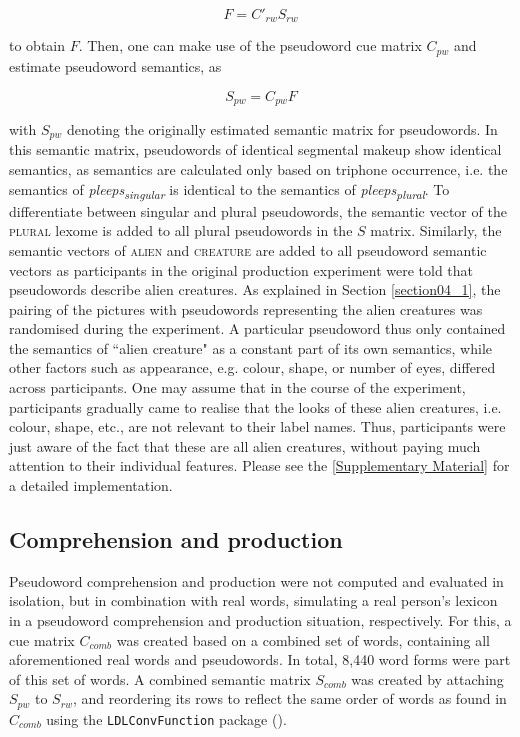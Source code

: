 \begin{equation}
\label{eq:FCSpw}
    F=C'_{rw}S_{rw}
\end{equation}

to obtain $F$. Then, one can make use of the pseudoword cue matrix $C_{pw}$ and estimate pseudoword semantics, as

\begin{equation}
\label{eq:SCFpw}
    S_{pw}=C_{pw}F
\end{equation}

with $S_{pw}$ denoting the originally estimated semantic matrix for pseudowords. In this semantic matrix, pseudowords of identical segmental makeup show identical semantics, as semantics are calculated only based on triphone occurrence, i.e. the semantics of \textit{pleeps\textsubscript{singular}} is identical to the semantics of \textit{pleeps\textsubscript{plural}}. To differentiate between singular and plural pseudowords, the semantic vector of the \textsc{plural} lexome is added to all plural pseudowords in the $S$ matrix. Similarly, the semantic vectors of \textsc{alien} and \textsc{creature} are added to all pseudoword semantic vectors as participants in the original production experiment were told that pseudowords describe alien creatures. As explained in Section \ref{section04_1}, the pairing of the pictures with pseudowords representing the alien creatures was randomised during the experiment. A particular pseudoword thus only contained the semantics of ``alien creature" as a constant part of its own semantics, while other factors such as appearance, e.g. colour, shape, or number of eyes, differed across participants. One may assume that in the course of the experiment, participants gradually came to realise that the looks of these alien creatures, i.e. colour, shape, etc., are not relevant to their label names. Thus, participants were just aware of the fact that these are all alien creatures, without paying much attention to their individual features. Please see the \ref{Supplementary Material} for a detailed implementation.

\subsection{Comprehension and production}\label{section05_1_5}

Pseudoword comprehension and production were not computed and evaluated in isolation, but in combination with real words, simulating a real person’s lexicon in a pseudoword comprehension and production situation, respectively. For this, a cue matrix $C_{comb}$ was created based on a combined set of words, containing all aforementioned real words and pseudowords. In total, 8,440 word forms were part of this set of words. A combined semantic matrix $S_{comb}$ was created by attaching $S_{pw}$ to $S_{rw}$, and reordering its rows to reflect the same order of words as found in $C_{comb}$ using the \texttt{LDLConvFunction} package (\cite{Schmitz2021ldlconv}).

